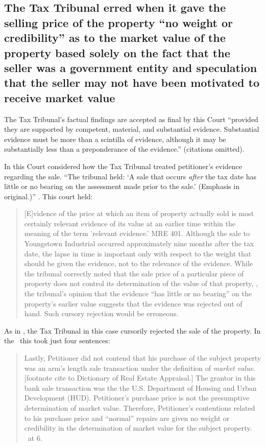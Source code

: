 \documentclass[12pt,\documentclassflag]{michiganCourtOfAppealsBrief}
\begin{document}
\subsection{The Tax Tribunal erred when it gave the selling price of the property ``no weight or credibility'' as to the market value of the property based solely on the fact that the seller was a government entity and speculation that the seller may not have been motivated to receive market value}

The Tax Tribunal's factual findings are accepted as final by this Court ``provided they are supported by competent, material, and substantial evidence. Substantial evidence must be more than a scintilla of evidence, although it may be substantially less than a preponderance of the evidence.''  (citations omitted).

In \cite[s]{Jones & Laughlin} this Court considered how the Tax Tribunal treated petitioner's evidence regarding the sale. ``The tribunal held: `A sale that occurs \textit{after} the tax date has little or no bearing on the assessment made prior to the sale.' (Emphasis in original.)'' . This court held:

\begin{quote}
[E]vidence of the price at which an item of property actually sold is most certainly relevant evidence of its value at an earlier time within the meaning of the term 'relevant evidence.' MRE 401. Although the sale to Youngstown Industrial occurred approximately nine months after the tax date, the lapse in time is important only with respect to the weight that should be given the evidence, not to the relevance of the evidence. While the tribunal correctly noted that the sale price of a particular piece of property does not control its determination of the value of that property, , the tribunal's opinion that the evidence ``has little or no bearing'' on the property's earlier value suggests that the evidence was rejected out of hand. Such cursory rejection would be erroneous. 
\end{quote} 

As in \cite[s]{Jones & Laughlin}, the Tax Tribunal in this case cursorily rejected the sale of the property. In the \FOJ\ this took just four sentences: 

\begin{quote}
	Lastly, Petitioner did not contend that his purchase of the subject property was an arm's length sale transaction under the definition of \textit{market value}. [footnote cite to Dictionary of Real Estate Appraisal.] The grantor in this bank sale transaction was the the U.S. Department of Housing and Urban Development (HUD). Petitioner's purchase price is not the presumptive determination of market value. Therefore, Petitioner's contentions related to his purchase price and ``normal'' repairs are given no weight or credibility in the determination of market value for the subject property. \FOJ\ at 6.
\end{quote}
\end{document}
